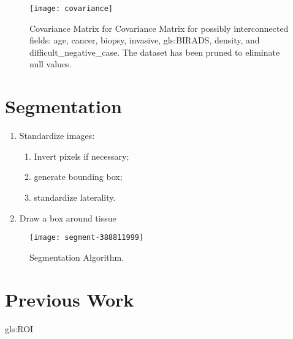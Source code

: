 \documentclass[]{article}
\begin{document}
\begin{figure}[H]
	\begin{center}
		\caption[Covariance Matrix for possibly interconnected fields]{Covariance Matrix for Covariance Matrix for possibly interconnected fields: age, cancer, biopsy, invasive, \gls{gls:BIRADS}, density, and difficult\_negative\_case. The dataset has been pruned to eliminate null values.}\label{fig:covariance}
		\texttt{[image: covariance]}
	\end{center}
\end{figure}

\section{Segmentation}

\begin{enumerate}
	\item Standardize images:\begin{enumerate}
		\item Invert pixels if necessary;
		\item generate bounding box;
		\item standardize laterality.
	\end{enumerate}
	\item Draw a box around tissue
\end{enumerate}
\begin{figure}[H]
	\begin{center}
		\caption[Segmentation Algorithm]{Segmentation Algorithm.}
		\texttt{[image: segment-388811999]}
	\end{center}
\end{figure}

\section{Previous Work}
\gls{gls:ROI}
\cite{shen2019deep}

\printglossaries




\end{document}
